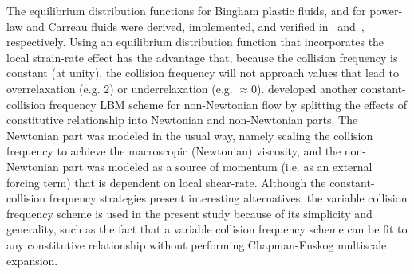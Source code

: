 The equilibrium distribution functions for Bingham plastic fluids, and for power-law and Carreau fluids were derived, implemented, and verified in~\cite{wang2008lattice} and~\cite{yoshino2007numerical}, respectively.
Using an equilibrium distribution function that incorporates the local strain-rate effect has the advantage that, because the collision frequency is constant (at unity), the collision frequency will not approach values that lead to overrelaxation (e.g. $2$) or underrelaxation (e.g. $\approx 0$).
\cite{wang2011lattice} developed another constant-collision frequency LBM scheme for non-Newtonian flow by splitting the effects of constitutive relationship into Newtonian and non-Newtonian parts.
The Newtonian part was modeled in the usual way, namely scaling the collision frequency to achieve the macroscopic (Newtonian) viscosity, and the non-Newtonian part was modeled as a source of momentum (i.e. as an external forcing term) that is dependent on local shear-rate.
Although the constant-collision frequency strategies present interesting alternatives, the variable collision frequency scheme is used in the present study because of its simplicity and generality, such as the fact that a variable collision frequency scheme can be fit to any constitutive relationship without performing Chapman-Enskog multiscale expansion.

